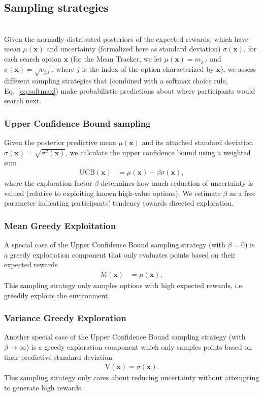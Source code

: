 \subsection*{Sampling strategies} \hspace*{\fill} \\ 
Given the normally distributed posteriors of the expected rewards, which have mean $\mu(\mathbf{x})$ and uncertainty (formalized here as standard deviation) $\sigma(\mathbf{x})$, for each search option $\mathbf{x}$ (for the Mean Tracker, we let $\mu(\mathbf{x}) = m_{j,t}$ and $\sigma(\mathbf{x}) = \sqrt{v_{j,t}}$, where $j$ is the index of the option characterized by $\mathbf{x}$), we assess different sampling strategies that (combined with a softmax choice rule, Eq.~\ref{eq:softmax}) make probabilistic predictions about where participants would search next. 

\subsubsection{Upper Confidence Bound sampling} 
Given the posterior predictive mean $\mu(\mathbf{x})$ and its attached standard deviation $\sigma(\mathbf{x}) = \sqrt{\sigma^2(\mathbf{x})}$, we calculate the upper confidence bound using a weighted sum
\begin{align}
\text{UCB}(\mathbf{x})&=\mu(\mathbf{x})+\beta \sigma(\mathbf{x}),
\end{align}
where the exploration factor $\beta$ determines how much reduction of uncertainty is valued (relative to exploiting known high-value options). We estimate $\beta$ as a free parameter indicating participants' tendency towards directed exploration.

\subsubsection{Mean Greedy Exploitation} 
A special case of the Upper Confidence Bound sampling strategy (with $\beta=0$) is a greedy exploitation component that only evaluates points based on their expected rewards
\begin{align}
\text{M}(\mathbf{x})&=\mu(\mathbf{x}), 
\end{align}
This sampling strategy only samples options with high expected rewards, i.e. greedily exploits the environment.

\subsubsection{Variance Greedy Exploration} 
Another special case of the Upper Confidence Bound sampling strategy (with $\beta \to \infty$) is a greedy exploration component which only samples points based on their predictive standard deviation
\begin{align}
\text{V}(\mathbf{x})=\sigma(\mathbf{x}).
\end{align}
This sampling strategy only cares about reducing uncertainty without attempting to generate high rewards.

